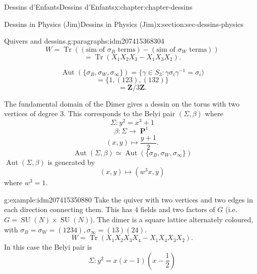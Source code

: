 \documentclass[oneside,10pt,]{book}
\numberwithin{equation}{section}
\newcommand{\inv}{^{-1}}
\newcommand{\ZZ}{\mathbf{Z}}
\DeclareMathOperator{\PP}{\mathbf{P}}
\DeclareMathOperator{\trace}{Tr}
\DeclareMathOperator{\Aut}{Aut}
\DeclareMathOperator{\specialunitary}{SU}
\begin{document}
\begin{chapterptx}{Dessins d'Enfants}{}{Dessins d'Enfants}{}{}{x:chapter:chapter-dessins}
\begin{sectionptx}{Dessins in Physics (Jim)}{}{Dessins in Physics (Jim)}{}{}{x:section:sec-dessins-physics}
\begin{paragraphs}{Quivers and dessins.}{g:paragraphs:idm207415368304}
\begin{equation*}
W = \trace((\text{sim of }\sigma_B\text{ terms}) - (\text{sim of }\sigma_W\text{ terms}))
\end{equation*}
%
\begin{equation*}
= \trace(X_1X_2X_3 - X_1X_3X_2)\text{.}
\end{equation*}
%
\par
%
\begin{equation*}
\Aut( \{\sigma_B,\sigma_W,\sigma_\infty\}) = \{ \gamma\in S_3: \gamma\sigma_i \gamma\inv = \sigma_i)
\end{equation*}
%
\begin{equation*}
= \{1,(123), (132)\}
\end{equation*}
%
\begin{equation*}
= \ZZ/3\ZZ\text{.}
\end{equation*}
%
\par
The fundamental domain of the Dimer gives a dessin on the torus with two vertices of degree 3. This corresponds to the Belyi pair \((\Sigma, \beta)\) where%
\begin{equation*}
\Sigma \colon y^2 = x^3 + 1
\end{equation*}
%
\begin{equation*}
\beta \colon \Sigma  \to \PP^1
\end{equation*}
%
\begin{equation*}
(x,y) \mapsto \frac{y+1}{2}\text{.}
\end{equation*}
%
\begin{equation*}
\Aut(\Sigma, \beta) \simeq \Aut(\{\sigma_B,\sigma_W, \sigma_\infty\})
\end{equation*}
\(\Aut(\Sigma, \beta)\) is generated by%
\begin{equation*}
(x,y) \mapsto (w^3 x,y)
\end{equation*}
where \(w^3 = 1\).%
\begin{example}{}{g:example:idm207415350880}%
Take the quiver with two vertices and two edges in each direction connecting them. This has 4 fields and two factors of \(G\) (i.e. \(G = \specialunitary (N) \times \specialunitary (N)\)). The dimer is a square lattice alternately coloured, with \(\sigma_B = \sigma_W = (1234), \sigma_\infty = (13)(24)\).%
\begin{equation*}
W = \trace (X_1X_2X_3X_4 - X_1 X_4 X_3 X_2)\text{.}
\end{equation*}
In this case the Belyi pair is%
\begin{equation*}
\Sigma \colon y^2= x(x-1)(x-\frac12)

\end{equation*}
\end{example}
\end{paragraphs}
\end{sectionptx}
\end{chapterptx}
\end{document}
